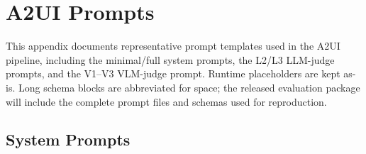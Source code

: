 \section{A2UI Prompts}
\label{app:a2ui-prompts}

This appendix documents representative prompt templates used in the A2UI pipeline, including the minimal/full system prompts, the L2/L3 LLM-judge prompts, and the V1--V3 VLM-judge prompt. Runtime placeholders are kept as-is. Long schema blocks are abbreviated for space; the released evaluation package will include the complete prompt files and schemas used for reproduction.

\subsection{System Prompts}
\label{app:a2ui-system-prompts}


